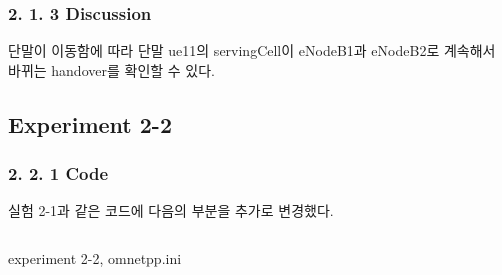     \subsubsection*{2. 1. 3 Discussion}
    \vspace{-3mm}
        단말이 이동함에 따라 단말 ue11의 servingCell이 eNodeB1과 eNodeB2로 계속해서 바뀌는 handover를 확인할 수 있다. 
\subsection*{Experiment 2-2}
    \subsubsection*{2. 2. 1 Code}
    \vspace{-3mm}
    실험 2-1과 같은 코드에 다음의 부분을 추가로 변경했다.
            \vspace{-2mm}
            \begin{listing}[h!]
            \inputminted[framerule = 1pt,framesep = 2mm , frame = lines, fontsize=\footnotesize]{c}{./code/week11/Experiment_02/omnet4.cpp}
            \vspace{-3mm}
            \caption{\footnotesize experiment 2-2, omnetpp.ini}
            \end{listing}
            \vspace{-6mm}
